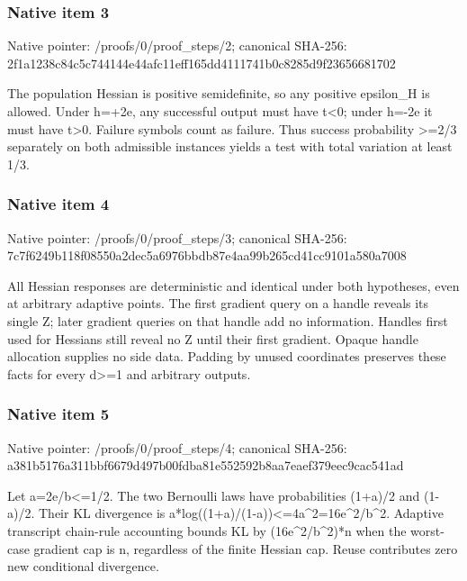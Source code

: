 \documentclass[10pt,a4paper]{article}
\begin{document}
\subsubsection{Native item 3}
Native pointer: /proofs/0/proof\_\allowbreak{}steps/2; canonical SHA-256: 2f1a1238c84c5c744144e44afc11eff165dd4111741b0c8285d9f23656681702

\begingroup\raggedright\sloppy The population Hessian is positive semidefinite,\allowbreak{} so any positive epsilon\_\allowbreak{}H is allowed. Under h=\allowbreak{}+2e,\allowbreak{} any successful output must have t<0;\allowbreak{} under h=\allowbreak{}-2e it must have t>0. Failure symbols count as failure. Thus success probability >=\allowbreak{}2/\allowbreak{}3 separately on both admissible instances yields a test with total variation at least 1/\allowbreak{}3.\par\endgroup

\subsubsection{Native item 4}
Native pointer: /proofs/0/proof\_\allowbreak{}steps/3; canonical SHA-256: 7c7f6249b118f08550a2dec5a6976bbdb87e4aa99b265cd41cc9101a580a7008

\begingroup\raggedright\sloppy All Hessian responses are deterministic and identical under both hypotheses,\allowbreak{} even at arbitrary adaptive points. The first gradient query on a handle reveals its single Z;\allowbreak{} later gradient queries on that handle add no information. Handles first used for Hessians still reveal no Z until their first gradient. Opaque handle allocation supplies no side data. Padding by unused coordinates preserves these facts for every d>=\allowbreak{}1 and arbitrary outputs.\par\endgroup

\subsubsection{Native item 5}
Native pointer: /proofs/0/proof\_\allowbreak{}steps/4; canonical SHA-256: a381b5176a311bbf6679d497b00fdba81e552592b8aa7eaef379eec9cac541ad

\begingroup\raggedright\sloppy Let a=\allowbreak{}2e/\allowbreak{}b<=\allowbreak{}1/\allowbreak{}2. The two Bernoulli laws have probabilities (1+a)/\allowbreak{}2 and (1-a)/\allowbreak{}2. Their KL divergence is a*log((1+a)/\allowbreak{}(1-a))<=\allowbreak{}4a\textasciicircum{}2=\allowbreak{}16e\textasciicircum{}2/\allowbreak{}b\textasciicircum{}2. Adaptive transcript chain-rule accounting bounds KL by (16e\textasciicircum{}2/\allowbreak{}b\textasciicircum{}2)*n when the worst-case gradient cap is n,\allowbreak{} regardless of the finite Hessian cap. Reuse contributes zero new conditional divergence.\par\endgroup
\end{document}
